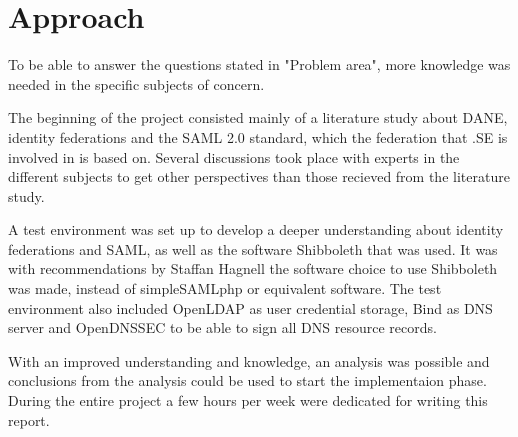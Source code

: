 \section{Approach}

To be able to answer the questions stated in "Problem area", more knowledge was needed in the specific subjects of concern.

The beginning of the project consisted mainly of a literature study about DANE, identity federations and the SAML 2.0 standard, which the federation that .SE is involved in is based on. 
Several discussions took place with experts in the different subjects to get other perspectives than those recieved from the literature study.

A test environment was set up to develop a deeper understanding about identity federations and SAML, as well as the software 
Shibboleth that was used. 
It was with recommendations by Staffan Hagnell the software choice to use Shibboleth was made, instead of simpleSAMLphp or equivalent software.
The test environment also included OpenLDAP as user credential storage, Bind as DNS server and OpenDNSSEC to be able to sign all DNS resource records.

With an improved understanding and knowledge, an analysis was possible and conclusions from the analysis could be used 
to start the implementaion phase. During the entire project a few hours per week were dedicated for writing this report.



 

